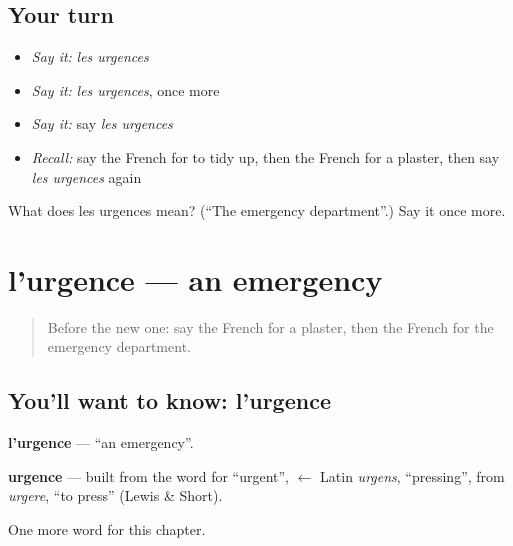 \subsection*{Your turn}
\begin{itemize}
\raggedright
  \item \emph{Say it:} \emph{les urgences}
  \item \emph{Say it:} \emph{les urgences}, once more
  \item \emph{Say it:} say \emph{les urgences}
  \item \emph{Recall:} say the French for to tidy up, then the French for a plaster, then say \emph{les urgences} again
\end{itemize}

\begin{tcolorbox}[breakable,colback=teal!4,colframe=teal!35!black,title={Before you move on}]
What does les urgences mean? (\textquotedblleft{}The emergency department\textquotedblright{}.) Say it once more.
\end{tcolorbox}
\section[l'urgence]{l'urgence — an emergency}

\label{lesson:FR-C243-urgence}



\begin{quote}
Before the new one: say the French for a plaster, then the French for the emergency department.
\end{quote}

\subsection*{You'll want to know: l'urgence}
\textbf{l'urgence} — \textquotedblleft{}an emergency\textquotedblright{}.

\begin{cousinweb}
\textbf{urgence} — built from the word for \textquotedblleft{}urgent\textquotedblright{}, $\leftarrow$ Latin \emph{urgens}, \textquotedblleft{}pressing\textquotedblright{}, from \emph{urgere}, \textquotedblleft{}to press\textquotedblright{} (Lewis \& Short).
\end{cousinweb}

\begin{grammarlens}[title={What you've built}]
One more word for this chapter.
\end{grammarlens}

